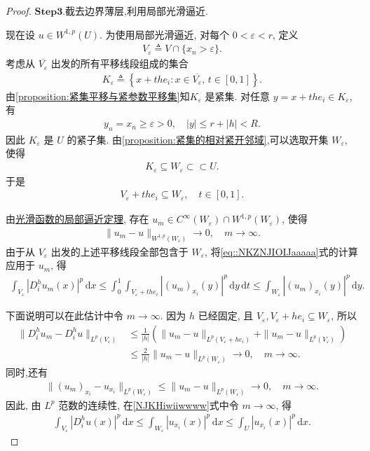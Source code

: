 \documentclass[../../main.tex]{subfiles}
\begin{document}
\begin{proof}
\noindent$\mathbf{Step}\bm{3}$.{\heiti 截去边界薄层,利用局部光滑逼近.}

现在设 $u\in W^{1,p}(U)$. 为使用局部光滑逼近, 对每个 $0<\varepsilon<r$, 定义
\begin{align*}
V_\varepsilon
\triangleq V\cap\{x_n>\varepsilon\}.
\end{align*}
考虑从 $\overline{V_\varepsilon}$ 出发的所有平移线段组成的集合
\begin{align*}
K_\varepsilon
\triangleq
\left\{
x+the_i:
x\in\overline{V_\varepsilon},\, t\in[0,1]
\right\}.
\end{align*}
由\cref{proposition:紧集平移与紧参数平移集}知$K_\varepsilon$ 是紧集. 对任意 $y=x+the_i\in K_\varepsilon$, 有
\begin{align*}
y_n=x_n\geqslant\varepsilon>0,\quad
|y|\leqslant r+|h|<R.
\end{align*}
因此 $K_\varepsilon$ 是 $U$ 的紧子集. 由\cref{proposition:紧集的相对紧开邻域},可以选取开集 $W_\varepsilon$, 使得
\begin{align*}
K_\varepsilon\subseteq W_\varepsilon\subset\subset U.
\end{align*}
于是
\begin{align*}
V_\varepsilon+the_i\subseteq W_\varepsilon,\quad t\in[0,1].
\end{align*}

由\hyperref[theorem:ch05-光滑函数的局部逼近定理]{光滑函数的局部逼近定理}, 存在
$u_m\in C^\infty(W_\varepsilon)\cap W^{1,p}(W_\varepsilon)$, 使得
\begin{align*}
\|u_m-u\|_{W^{1,p}(W_\varepsilon)}
\longrightarrow0,\quad m\to\infty.
\end{align*}
由于从 $V_\varepsilon$ 出发的上述平移线段全部包含于 $W_\varepsilon$, 将\eqref{eq::NKZNJIOIJaaaaa}式的计算应用于 $u_m$, 得
\begin{align}\label{NJKHiwiiwwww}
\int_{V_\varepsilon}|D_i^h u_m(x)|^p\,\mathrm{d}x
\leqslant
\int_0^1\int_{V_\varepsilon+the_i}
|(u_m)_{x_i}(y)|^p\,\mathrm{d}y\,\mathrm{d}t
\leqslant
\int_{W_\varepsilon}|(u_m)_{x_i}(y)|^p\,\mathrm{d}y.
\end{align}

下面说明可以在此估计中令 $m\to\infty$. 因为 $h$ 已经固定, 且
$V_\varepsilon,V_\varepsilon+he_i\subseteq W_\varepsilon$, 所以
\begin{align*}
\|D_i^h u_m-D_i^h u\|_{L^p(V_\varepsilon)}
&\leqslant
\frac{1}{|h|}
\left(
\|u_m-u\|_{L^p(V_\varepsilon+he_i)}
+
\|u_m-u\|_{L^p(V_\varepsilon)}
\right)\\
&\leqslant
\frac{2}{|h|}
\|u_m-u\|_{L^p(W_\varepsilon)}
\longrightarrow0,\quad m\to\infty.
\end{align*}
同时,还有
\begin{align*}
\|(u_m)_{x_i}-u_{x_i}\|_{L^p(W_\varepsilon)}\leqslant \|u_m-u\|_{L^p(W_\varepsilon)}
\longrightarrow0,\quad m\to\infty.
\end{align*}
因此, 由 $L^p$ 范数的连续性, 在\eqref{NJKHiwiiwwww}式中令 $m\to\infty$, 得
\begin{align*}
\int_{V_\varepsilon}|D_i^h u(x)|^p\,\mathrm{d}x
\leqslant
\int_{W_\varepsilon}|u_{x_i}(x)|^p\,\mathrm{d}x\leqslant
\int_U|u_{x_i}(x)|^p\,\mathrm{d}x.
\end{align*}


\end{proof}
\end{document}

